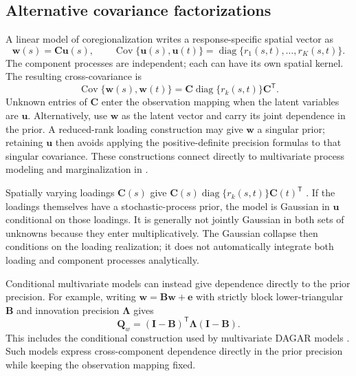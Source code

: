 \documentclass[11pt]{article}
\newcommand{\bw}{\bm{w}}
\newcommand{\bu}{\bm{u}}
\newcommand{\bB}{\bm{B}}
\newcommand{\bC}{\bm{C}}
\newcommand{\bI}{\bm{I}}
\newcommand{\bQ}{\bm{Q}}
\newcommand{\bLambda}{\bm{\Lambda}}
\newcommand{\trans}{^{\mathsf T}}
\DeclareMathOperator{\diag}{diag}
\DeclareMathOperator{\Cov}{Cov}
\begin{document}
\subsection{Alternative covariance factorizations}
A linear model of coregionalization writes a response-specific spatial vector as
\begin{equation}\label{eq:lmc}
 \bw(s)=\bC\bu(s),\qquad
 \Cov\{\bu(s),\bu(t)\}=\diag\{r_1(s,t),\ldots,r_K(s,t)\}.
\end{equation}
The component processes are independent; each can have its own spatial kernel.
The resulting cross-covariance is
\begin{equation}
 \Cov\{\bw(s),\bw(t)\}=\bC\diag\{r_k(s,t)\}\bC\trans.
\end{equation}
Unknown entries of $\bC$ enter the observation mapping when the latent variables
are $\bu$. Alternatively, use $\bw$ as the latent vector and carry its joint
dependence in the prior. A reduced-rank loading construction may give $\bw$ a
singular prior; retaining $\bu$ then avoids applying the positive-definite
precision formulas to that singular covariance. These constructions connect
directly to multivariate process modeling and marginalization in \cite{Finley2008}.

Spatially varying loadings $\bC(s)$ give
$\bC(s)\diag\{r_k(s,t)\}\bC(t)\trans$ \cite{Gelfand2004}.
If the loadings themselves have a stochastic-process prior, the model is Gaussian
in $\bu$ conditional on those loadings. It is generally not jointly Gaussian in
both sets of unknowns because they enter multiplicatively. The Gaussian collapse
then conditions on the loading realization; it does not automatically integrate
both loading and component processes analytically.

Conditional multivariate models can instead give dependence directly to the
prior precision. For example, writing $\bw=\bB\bw+\bm{e}$ with strictly block
lower-triangular $\bB$ and innovation precision $\bLambda$ gives
\begin{equation}
 \bQ_w=(\bI-\bB)\trans\bLambda(\bI-\bB).
\end{equation}
This includes the conditional construction used by multivariate DAGAR models
\cite{Gao2022}. Such models express cross-component dependence directly in the
prior precision while keeping the observation mapping fixed.
\end{document}
